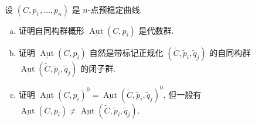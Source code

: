 \begin{exercise}\label{src:6.3.8}
设 $(C,\allowbreak p_1,\allowbreak \ldots,\allowbreak p_n)$ 是 $n$-点预稳定曲线.
\begin{enumerate}[(a)]
\item 证明自同构群概形 $\underline{\operatorname{Aut}}(C,\allowbreak p_i)$ 是代数群.
\item 证明 $\underline{\operatorname{Aut}}(C,\allowbreak p_i)$ 自然是带标记正规化 $(\widetilde C,\allowbreak \widetilde p_i,\allowbreak \widetilde q_j)$ 的自同构群 $\underline{\operatorname{Aut}}(\widetilde C,\allowbreak \widetilde p_i,\allowbreak \widetilde q_j)$ 的闭子群.
\item 证明 $\underline{\operatorname{Aut}}(C,\allowbreak p_i)^0=\underline{\operatorname{Aut}}(\widetilde C,\allowbreak \widetilde p_i,\allowbreak \widetilde q_j)^0$, 但一般有 $\underline{\operatorname{Aut}}(C,\allowbreak p_i)\neq\underline{\operatorname{Aut}}(\widetilde C,\allowbreak \widetilde p_i,\allowbreak \widetilde q_j)$.
\end{enumerate}
\end{exercise}
